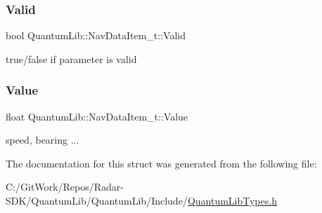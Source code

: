 \subsubsection{\texorpdfstring{Valid}{Valid}}
{\footnotesize\ttfamily bool Quantum\+Lib\+::\+Nav\+Data\+Item\+\_\+t\+::\+Valid}



true/false if parameter is valid 

\mbox{\label{struct_quantum_lib_1_1_nav_data_item__t_adc4958b22d1565c0697cf62208f5d3ca}} 
\subsubsection{\texorpdfstring{Value}{Value}}
{\footnotesize\ttfamily float Quantum\+Lib\+::\+Nav\+Data\+Item\+\_\+t\+::\+Value}



speed, bearing ... 



The documentation for this struct was generated from the following file\+:\begin{DoxyCompactItemize}
\item 
C\+:/\+Git\+Work/\+Repos/\+Radar-\/\+S\+D\+K/\+Quantum\+Lib/\+Quantum\+Lib/\+Include/\mbox{\hyperlink{_quantum_lib_types_8h}{Quantum\+Lib\+Types.\+h}}\end{DoxyCompactItemize}
